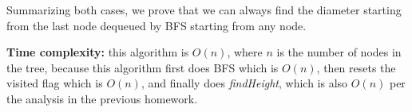 \documentclass{article}
\begin{document}
\begin{description}
  Summarizing both cases, we prove that we can always find the diameter starting from the last node dequeued by BFS starting from any node.

  \textbf{Time complexity:} this algorithm is $O(n)$, where $n$ is the number of nodes in the tree, because this algorithm first does BFS which is $O(n)$, then resets the visited flag which is $O(n)$, and finally does \textit{findHeight}, which is also $O(n)$ per the analysis in the previous homework.

\end{description}
\end{document}
